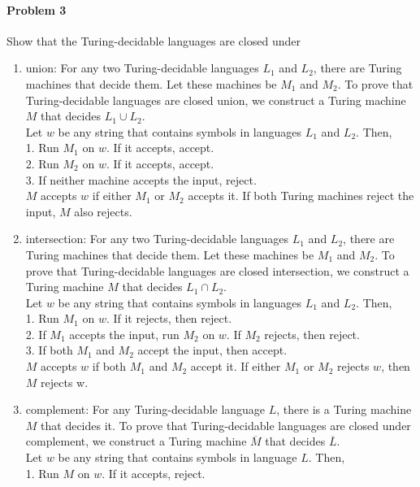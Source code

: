 \documentclass{article}
\begin{document}
\paragraph{Problem 3}
Show that the Turing-decidable languages are closed under
\begin{enumerate}[\indent a)]
    \item union: For any two Turing-decidable languages $L_1$ and $L_2$, there are Turing machines that decide them. Let these machines be $M_1$ and $M_2$. To prove that Turing-decidable languages are closed union, we construct a Turing machine $M$ that decides $L_1 \cup L_2$.
    \\Let $w$ be any string that contains symbols in languages $L_1$ and $L_2$. Then,
    \\1. Run $M_1$ on $w$. If it accepts, accept.
    \\2. Run $M_2$ on $w$. If it accepts, accept.
    \\3. If neither machine accepts the input, reject.
    \\$M$ accepts $w$ if either $M_1$ or $M_2$ accepts it. If both Turing machines reject the input, $M$ also rejects.
    \item intersection: For any two Turing-decidable languages $L_1$ and $L_2$, there are Turing machines that decide them. Let these machines be $M_1$ and $M_2$. To prove that Turing-decidable languages are closed intersection, we construct a Turing machine $M$ that decides $L_1 \cap L_2$.
    \\Let $w$ be any string that contains symbols in languages $L_1$ and $L_2$. Then,
    \\1. Run $M_1$ on $w$. If it rejects, then reject.
    \\2. If $M_1$ accepts the input, run $M_2$ on $w$. If $M_2$ rejects, then reject.
    \\3. If both $M_1$ and $M_2$ accept the input, then accept.
    \\$M$ accepts $w$ if both $M_1$ and $M_2$ accept it. If either $M_1$ or $M_2$ rejects $w$, then $M$ rejects w.
    \item complement: For any Turing-decidable language $L$, there is a Turing machine $M$ that decides it. To prove that Turing-decidable languages are closed under complement, we construct a Turing machine $\overline{M}$ that decides $\overline{L}$.
    \\Let $w$ be any string that contains symbols in language $L$. Then,
    \\1. Run $M$ on $w$. If it accepts, reject.

\end{enumerate}
\end{document}

